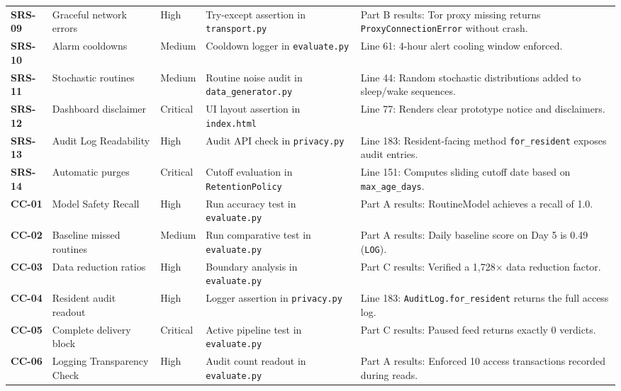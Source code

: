 \documentclass[conference]{IEEEtran}
\begin{document}
\begin{table}[htbp]
\begin{tabular}{lp{2.4cm}lp{4.2cm}p{4.2cm}}
\textbf{SRS-09} & Graceful network errors & High & Try-except assertion in \texttt{transport.py} & Part B results: Tor proxy missing returns \texttt{ProxyConnectionError} without crash. \\
\textbf{SRS-10} & Alarm cooldowns & Medium & Cooldown logger in \texttt{evaluate.py} & Line 61: 4-hour alert cooling window enforced. \\
\textbf{SRS-11} & Stochastic routines & Medium & Routine noise audit in \texttt{data\_generator.py} & Line 44: Random stochastic distributions added to sleep/wake sequences. \\
\textbf{SRS-12} & Dashboard disclaimer & Critical & UI layout assertion in \texttt{index.html} & Line 77: Renders clear prototype notice and disclaimers. \\
\textbf{SRS-13} & Audit Log Readability & High & Audit API check in \texttt{privacy.py} & Line 183: Resident-facing method \texttt{for\_resident} exposes audit entries. \\
\textbf{SRS-14} & Automatic purges & Critical & Cutoff evaluation in \texttt{RetentionPolicy} & Line 151: Computes sliding cutoff date based on \texttt{max\_age\_days}. \\
\textbf{CC-01} & Model Safety Recall & High & Run accuracy test in \texttt{evaluate.py} & Part A results: RoutineModel achieves a recall of 1.0. \\
\textbf{CC-02} & Baseline missed routines & Medium & Run comparative test in \texttt{evaluate.py} & Part A results: Daily baseline score on Day 5 is 0.49 (\texttt{LOG}). \\
\textbf{CC-03} & Data reduction ratios & High & Boundary analysis in \texttt{evaluate.py} & Part C results: Verified a 1,728$\times$ data reduction factor. \\
\textbf{CC-04} & Resident audit readout & High & Logger assertion in \texttt{privacy.py} & Line 183: \texttt{AuditLog.for\_resident} returns the full access log. \\
\textbf{CC-05} & Complete delivery block & Critical & Active pipeline test in \texttt{evaluate.py} & Part C results: Paused feed returns exactly 0 verdicts. \\
\textbf{CC-06} & Logging Transparency Check & High & Audit count readout in \texttt{evaluate.py} & Part A results: Enforced 10 access transactions recorded during reads. \\
\bottomrule
\end{tabular}
\end{table}
\end{document}
